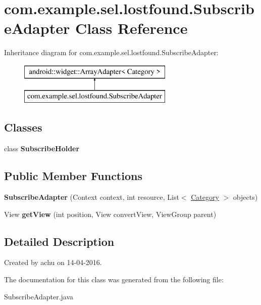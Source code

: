 \hypertarget{classcom_1_1example_1_1sel_1_1lostfound_1_1SubscribeAdapter}{}\section{com.\+example.\+sel.\+lostfound.\+Subscribe\+Adapter Class Reference}
\label{classcom_1_1example_1_1sel_1_1lostfound_1_1SubscribeAdapter}
Inheritance diagram for com.\+example.\+sel.\+lostfound.\+Subscribe\+Adapter\+:\begin{figure}[H]
\begin{center}
\leavevmode
\includegraphics[height=2.000000cm]{classcom_1_1example_1_1sel_1_1lostfound_1_1SubscribeAdapter}
\end{center}
\end{figure}
\subsection*{Classes}
\begin{DoxyCompactItemize}
\item 
class {\bfseries Subscribe\+Holder}
\end{DoxyCompactItemize}
\subsection*{Public Member Functions}
\begin{DoxyCompactItemize}
\item 
{\bfseries Subscribe\+Adapter} (Context context, int resource, List$<$ \hyperlink{classcom_1_1example_1_1sel_1_1lostfound_1_1Category}{Category} $>$ objects)\hypertarget{classcom_1_1example_1_1sel_1_1lostfound_1_1SubscribeAdapter_ad5670875fa5fcc236d9c794303f04369}{}\label{classcom_1_1example_1_1sel_1_1lostfound_1_1SubscribeAdapter_ad5670875fa5fcc236d9c794303f04369}

\item 
View {\bfseries get\+View} (int position, View convert\+View, View\+Group parent)\hypertarget{classcom_1_1example_1_1sel_1_1lostfound_1_1SubscribeAdapter_a942f195e46312808aff706a8a4e15e02}{}\label{classcom_1_1example_1_1sel_1_1lostfound_1_1SubscribeAdapter_a942f195e46312808aff706a8a4e15e02}

\end{DoxyCompactItemize}


\subsection{Detailed Description}
Created by achu on 14-\/04-\/2016. 

The documentation for this class was generated from the following file\+:\begin{DoxyCompactItemize}
\item 
Subscribe\+Adapter.\+java\end{DoxyCompactItemize}
